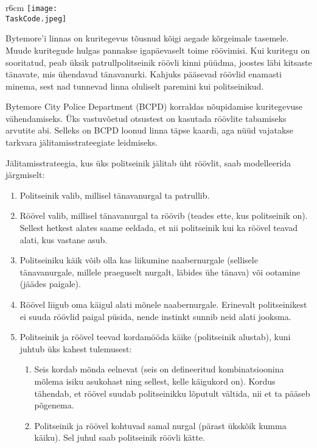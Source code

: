\documentclass{boi2014}
\renewcommand{\TaskCode}{coprobber}
\begin{document}
    \begin{wrapfigure}[8]{r}{6cm}
        \vspace{-24pt}
		\texttt{[image: \\TaskCode.jpeg]}
	\end{wrapfigure}

    Bytemore'i linnas on kuritegevus tõusnud kõigi aegade kõrgeimale tasemele. 
    Muude kuritegude hulgas pannakse igapäevaselt toime röövimisi. 
    Kui kuritegu on sooritatud, peab üksik patrullpolitseinik röövli kinni püüdma, joostes läbi kitsaste tänavate, mis ühendavad tänavanurki. 
    Kahjuks pääsevad röövlid enamasti minema, sest nad tunnevad linna oluliselt paremini kui politseinikud.

    Bytemore City Police Department (BCPD) korraldas nõupidamise kuritegevuse vähendamiseks. 
    Üks vastuvõetud otsustest on kasutada röövlite tabamiseks arvutite abi. 
    Selleks on BCPD loonud linna täpse kaardi, aga nüüd vajatakse tarkvara jälitamisstrateegiate leidmiseks.

    Jälitamisstrateegia, kus üks politseinik jälitab üht röövlit, saab modelleerida järgmiselt:
    \begin{enumerate}
        \item Politseinik valib, millisel tänavanurgal ta patrullib.
        \item Röövel valib, millisel tänavanurgal ta röövib (teades ette, kus politseinik on). Sellest hetkest alates saame eeldada, et nii politseinik kui ka röövel teavad alati, kus vastane asub.
        \item Politseiniku käik võib olla kas liikumine naabernurgale (sellisele tänavanurgale, millele praeguselt nurgalt, läbides ühe tänava) või ootamine (jäädes paigale).
        \item Röövel liigub oma käigul alati mõnele naabernurgale. Erinevalt politseinikest ei suuda röövlid paigal püsida, nende instinkt sunnib neid alati jooksma.
        \item Politseinik ja röövel teevad kordamööda käike (politseinik alustab), kuni juhtub üks kahest tulemusest:
        \begin{enumerate}
            \item Seis kordab mõnda eelnevat (seis on defineeritud kombinatsioonina mõlema isiku asukohast ning sellest, kelle käigukord on). Kordus tähendab, et röövel suudab politseinikku lõputult vältida, nii et ta pääseb põgenema.
            \item Politseinik ja röövel kohtuvad samal nurgal (pärast ükskõik kumma käiku). Sel juhul saab politseinik röövli kätte.
        \end{enumerate}
    \end{enumerate}
\end{document}
